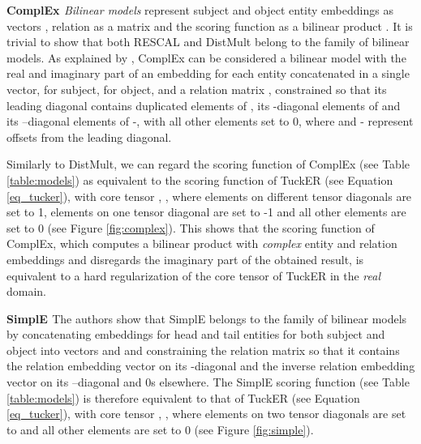 \documentclass[11pt,a4paper]{article}
\newcommand{\keypoint}[1]{\vspace{0.1cm}\noindent\textbf{#1}\quad}
\begin{document}
\keypoint{ComplEx \cite{trouillon2016complex}} \textit{Bilinear models} represent subject and object entity embeddings as vectors , relation as a matrix  and the scoring function as a bilinear product . It is trivial to show that both RESCAL and DistMult belong to the family of bilinear models. As explained by \citet{kazemi2018simple}, ComplEx can be considered a bilinear model with the real and imaginary part of an embedding for each entity concatenated in a single vector,  for subject,  for object, and a relation matrix , constrained so that its leading diagonal contains duplicated elements of , its -diagonal elements of  and its --diagonal elements of -, with all other elements set to 0, where  and - represent offsets from the leading diagonal. 

Similarly to DistMult, we can regard the scoring function of ComplEx (see Table \ref{table:models}) as equivalent to the scoring function of TuckER (see Equation \ref{eq_tucker}), with core tensor , , where  elements on different tensor diagonals are set to 1,  elements on one tensor diagonal are set to -1 and all other elements are set to 0 (see Figure \ref{fig:complex}). This shows that the scoring function of ComplEx, which computes a bilinear product with \textit{complex} entity and relation embeddings and disregards the imaginary part of the obtained result, is equivalent to a hard regularization of the core tensor of TuckER in the \textit{real} domain.  

\keypoint{SimplE \cite{kazemi2018simple}} The authors show that SimplE belongs to the family of bilinear models by concatenating embeddings for head and tail entities for both subject and object into vectors  and  and constraining the relation matrix  so that it contains the relation embedding vector  on its -diagonal and the inverse relation embedding vector  on its --diagonal and 0s elsewhere. The SimplE scoring function (see Table \ref{table:models}) is therefore equivalent to that of TuckER (see Equation \ref{eq_tucker}), with core tensor , , where  elements on two tensor diagonals are set to  and all other elements are set to 0 (see Figure \ref{fig:simple}).
\end{document}
